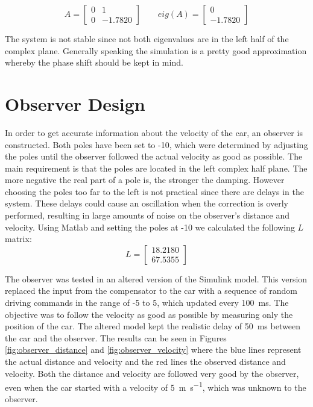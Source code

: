 \documentclass[final]{scrreprt} %
\begin{document}
\begin{equation}
A=
\begin{bmatrix}
  0 & 1 \\
  0 & -1.7820
 \end{bmatrix}
\qquad
eig(A)=
\begin{bmatrix}
   0 \\
  -1.7820
 \end{bmatrix}
\end{equation}

The system is not stable since not both eigenvalues are in the left half of the complex plane.
Generally speaking the simulation is a pretty good approximation whereby the phase shift should be kept in mind.

\section*{Observer Design}
In order to get accurate information about the velocity of the car, an observer is constructed.
Both poles have been set to -10, which were determined by adjusting the poles until the observer followed the actual velocity as good as possible.
The main requirement is that the poles are located in the left complex half plane.
The more negative the real part of a pole is, the stronger the damping.
However choosing the poles too far to the left is not practical since there are delays in the system.
These delays could cause an oscillation when the correction is overly performed, resulting in large amounts of noise on the observer's distance and velocity.
Using Matlab and setting the poles at -10 we calculated the following $L$ matrix:
\begin{equation}
L=
\begin{bmatrix}
  18.2180 \\
  67.5355
 \end{bmatrix}
\end{equation}

The observer was tested in an altered version of the Simulink model.
This version replaced the input from the compensator to the car with a sequence of random driving commands in the range of -5 to 5, which updated every \SI{100}{\milli\second}.
The objective was to follow the velocity as good as possible by measuring only the position of the car.
The altered model kept the realistic delay of \SI{50}{\milli\second} between the car and the observer.
The results can be seen in Figures \ref{fig:observer_distance} and \ref{fig:observer_velocity} where the blue lines represent the actual distance and velocity and the red lines the observed distance and velocity.
Both the distance and velocity are followed very good by the observer, even when the car started with a velocity of \SI{5}{\metre\per\second}, which was unknown to the observer.
\end{document}
